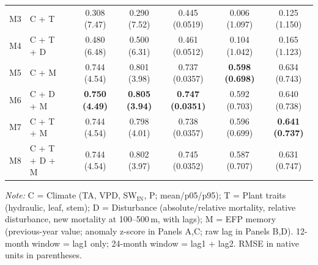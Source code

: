 \begin{table}[htbp]
\begin{tabular}{llcccccc}
M3 & C + T &  & 0.308 (7.47) & 0.290 (7.52) & 0.445 (0.0519) & 0.006 (1.097) & 0.125 (1.150) \\
M4 & C + T + D &  & 0.480 (6.48) & 0.500 (6.31) & 0.461 (0.0512) & 0.104 (1.042) & 0.165 (1.123) \\
M5 & C + M &  & 0.744 (4.54) & 0.801 (3.98) & 0.737 (0.0357) & \textbf{0.598 (0.698)} & 0.634 (0.743) \\
M6 & C + D + M &  & \textbf{0.750 (4.49)} & \textbf{0.805 (3.94)} & \textbf{0.747 (0.0351)} & 0.592 (0.703) & 0.640 (0.738) \\
M7 & C + T + M &  & 0.744 (4.54) & 0.798 (4.01) & 0.738 (0.0357) & 0.596 (0.699) & \textbf{0.641 (0.737)} \\
M8 & C + T + D + M &  & 0.744 (4.54) & 0.802 (3.97) & 0.745 (0.0352) & 0.587 (0.707) & 0.631 (0.747) \\
\midrule
\bottomrule
\end{tabular}
\vspace{2pt}
\begin{minipage}{\linewidth}
\footnotesize
\textit{Note:} C = Climate (TA, VPD, SW$_\mathrm{IN}$, P; mean/p05/p95); T = Plant traits (hydraulic, leaf, stem); D = Disturbance (absolute/relative mortality, relative disturbance, new mortality at 100--500\,m, with lags); M = EFP memory (previous-year value; anomaly z-score in Panels A,C; raw lag in Panels B,D). 12-month window = lag1 only; 24-month window = lag1 + lag2. RMSE in native units in parentheses.
\end{minipage}
\end{table}

